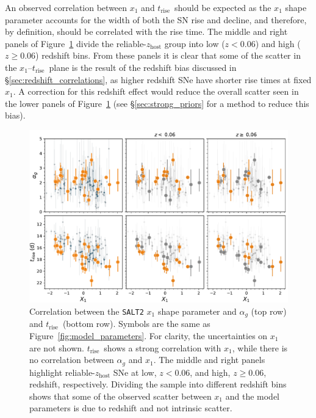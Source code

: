 \documentclass[twocolumn]{aastex63}
\newcommand{\trise}{$t_\mathrm{rise}$}
\begin{document}
An observed correlation between $x_1$ and \trise\ should be expected as the
$x_1$ shape parameter accounts for the width of both the SN rise and decline,
and therefore, by definition, should be correlated with the rise time. The
middle and right panels of Figure~\ref{fig:shape_correlations} divide the
reliable-$z_\mathrm{host}$ group into low ($z < 0.06$) and high ($z \ge 0.06$)
redshift bins. From these panels it is clear that some of the scatter in the
$x_1$--\trise\ plane is the result of the redshift bias discussed in
\S\ref{sec:redshift_correlations}, as higher redshift SNe have shorter rise
times at fixed $x_1$. A correction for this redshift effect would reduce the
overall scatter seen in the lower panels of
Figure~\ref{fig:shape_correlations} (see \S\ref{sec:strong_priors} for a
method to reduce this bias).

\begin{figure}
    \centering
    \includegraphics[width=6in]{./figures/shape_correlations.pdf}
    \caption{Correlation between the \texttt{SALT2} $x_1$ shape parameter and
    $\alpha_g$ (top row) and \trise\ (bottom row). Symbols are the same as
    Figure~\ref{fig:model_parameters}. For clarity, the uncertainties on $x_1$
    are not shown. \trise\ shows a strong correlation with $x_1$, while there
    is no correlation between $\alpha_g$ and $x_1$. The middle and right
    panels highlight reliable-$z_\mathrm{host}$ SNe at low, $z < 0.06$, and
    high, $z \ge 0.06$, redshift, respectively. Dividing the sample into
    different redshift bins shows that some of the observed scatter between
    $x_1$ and the model parameters is due to redshift and not intrinsic
    scatter. }
    \label{fig:shape_correlations}
\end{figure}
\end{document}

